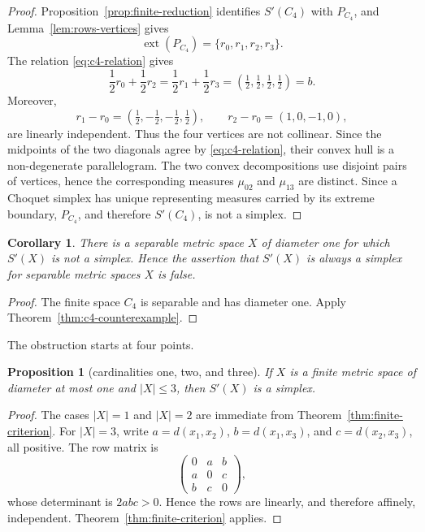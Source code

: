 \documentclass{proc-l}
\numberwithin{equation}{section}
\newtheorem{proposition}[theorem]{Proposition}
\newtheorem{corollary}[theorem]{Corollary}
\theoremstyle{definition}
\theoremstyle{remark}
\newcommand{\ext}{\operatorname{ext}}
\begin{document}
\begin{proof}
Proposition~\ref{prop:finite-reduction} identifies \(S'(C_4)\) with \(P_{C_4}\), and
Lemma~\ref{lem:rows-vertices} gives
\[
        \ext(P_{C_4})=\{r_0,r_1,r_2,r_3\}.
\]
The relation \eqref{eq:c4-relation} gives
\[
        \frac12r_0+\frac12r_2
        =\frac12r_1+\frac12r_3
        =(\tfrac12,\tfrac12,\tfrac12,\tfrac12)=b.
\]
Moreover,
\[
        r_1-r_0=(\tfrac12,-\tfrac12,-\tfrac12,\tfrac12),
        \qquad
        r_2-r_0=(1,0,-1,0),
\]
are linearly independent.  Thus the four vertices are not collinear.  Since the
midpoints of the two diagonals agree by \eqref{eq:c4-relation}, their convex
hull is a non-degenerate parallelogram.  The two convex decompositions use
disjoint pairs of vertices, hence the corresponding measures \(\mu_{02}\) and
\(\mu_{13}\) are distinct.  Since a Choquet simplex has unique representing
measures carried by its extreme boundary, \(P_{C_4}\), and therefore
\(S'(C_4)\), is not a simplex.
\end{proof}

\begin{corollary}\label{cor:q1-finite}
There is a separable metric space \(X\) of diameter one for which \(S'(X)\) is
not a simplex.  Hence the assertion that \(S'(X)\) is always a simplex for
separable metric spaces \(X\) is false.
\end{corollary}

\begin{proof}
The finite space \(C_4\) is separable and has diameter one.  Apply
Theorem~\ref{thm:c4-counterexample}.
\end{proof}

The obstruction starts at four points.

\begin{proposition}[cardinalities one, two, and three]\label{prop:small-cardinalities}
If \(X\) is a finite metric space of diameter at most one and \(|X|\le3\), then
\(S'(X)\) is a simplex.
\end{proposition}

\begin{proof}
The cases \(|X|=1\) and \(|X|=2\) are immediate from Theorem~\ref{thm:finite-criterion}.
For \(|X|=3\), write
\(a=d(x_1,x_2)\), \(b=d(x_1,x_3)\), and \(c=d(x_2,x_3)\), all positive.  The
row matrix is
\[
        \begin{pmatrix}0&a&b\\ a&0&c\\ b&c&0\end{pmatrix},
\]
whose determinant is \(2abc>0\).  Hence the rows are linearly, and therefore
affinely, independent.  Theorem~\ref{thm:finite-criterion} applies.
\end{proof}
\end{document}
